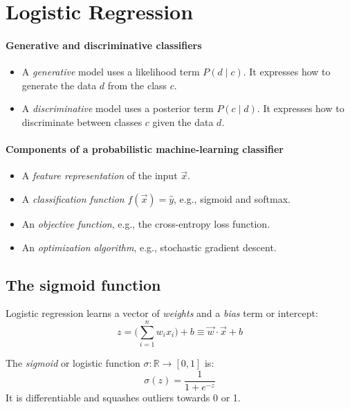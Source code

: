 \section{Logistic Regression}

\paragraph{Generative and discriminative classifiers}

\begin{itemize}
  \item A \textit{generative} model uses a likelihood term $P(d \mid c)$.
        It expresses how to generate the data $d$ from the class $c$.
  \item A \textit{discriminative} model uses a posterior term $P(c \mid d)$.
        It expresses how to discriminate between classes $c$ given the data $d$.
\end{itemize}

\paragraph{Components of a probabilistic machine-learning classifier}

\begin{itemize}
  \item A \textit{feature representation} of the input $\vec{x}$.
  \item A \textit{classification function} $f(\vec{x}) = \hat{y}$, e.g., sigmoid and softmax.
  \item An \textit{objective function}, e.g., the cross-entropy loss function.
  \item An \textit{optimization algorithm}, e.g., stochastic gradient descent.
\end{itemize}

\subsection{The sigmoid function}

Logistic regression learns a vector of \textit{weights} and a \textit{bias} term or intercept:
\begin{equation}
  \label{eqnClassification}
  z = \biggl( \sum_{i = 1}^{n} w_i x_i \biggr) + b \equiv \vec{w} \cdot \vec{x} + b
\end{equation}

The \textit{sigmoid} or logistic function $\sigma : \mathbb{R} \to [0, 1]$ is:
\begin{equation}
  \label{eqnSigmoid}
  \sigma(z) = \frac{1}{1 + e^{-z}}
\end{equation}
It is differentiable and squashes outliers towards 0 or 1.

